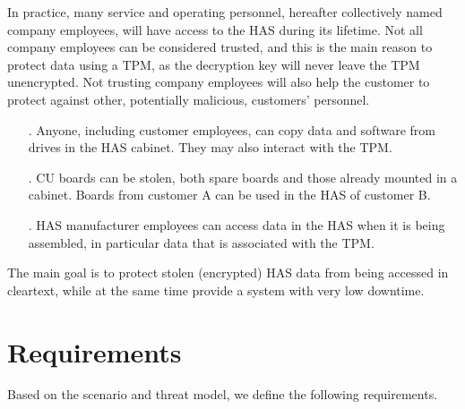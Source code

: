 {In practice, many service and operating personnel, hereafter collectively named company employees, will have access to the HAS during its lifetime. Not all company employees can be considered trusted, and this is the main reason to protect data using a TPM, as the decryption key will never leave the TPM unencrypted. Not trusting company employees will also help the customer to protect against other, potentially malicious, customers' personnel.

\begin{itemize}
\item[\namedlabel{TcustEmployees}{T1}.] Anyone, including customer employees, can copy data and software from drives in the HAS cabinet. They may also interact with the TPM.
\item[\namedlabel{Tstolen}{T2}.] CU boards can be stolen, both spare boards and those already mounted in a cabinet. Boards from customer A can be used in the HAS of customer B.
\item[\namedlabel{THAS}{T3}.] HAS manufacturer employees can access data in the HAS when it is being assembled, in particular data that is associated with the TPM.
\end{itemize}

The main goal is to protect stolen (encrypted) HAS data from being accessed in cleartext, while at the same time provide a system with very low downtime. 

\section{Requirements} \label{sec:requirements}
Based on the scenario and threat model, we define the following requirements.

}
